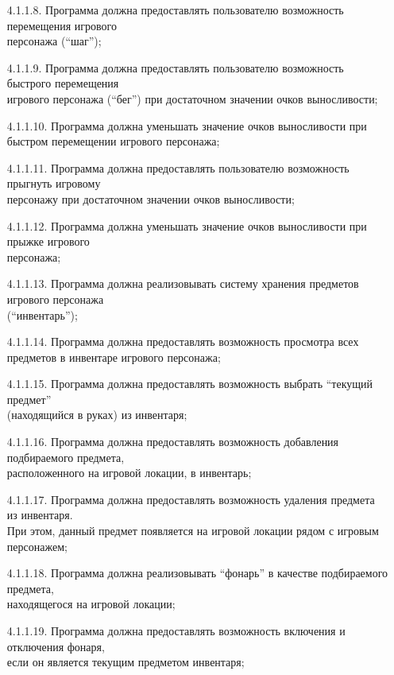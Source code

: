 \begin{enumerate}
    \item[4.1.1.8.] Программа должна предоставлять пользователю возможность перемещения игрового\\
    персонажа (``шаг'');
    \item[4.1.1.9.] Программа должна предоставлять пользователю возможность быстрого перемещения\\
    игрового персонажа (``бег'') при достаточном значении очков выносливости;
    \item[4.1.1.10.] Программа должна уменьшать значение очков выносливости при быстром перемещении игрового персонажа;
    \item[4.1.1.11.] Программа должна предоставлять пользователю возможность прыгнуть игровому\\
    персонажу при достаточном значении очков выносливости;
    \item[4.1.1.12.] Программа должна уменьшать значение очков выносливости при прыжке игрового\\
    персонажа;
    \item[4.1.1.13.] Программа должна реализовывать систему хранения предметов игрового персонажа\\
    (``инвентарь'');
    \item[4.1.1.14.] Программа должна предоставлять возможность просмотра всех предметов в инвентаре игрового персонажа;
    \item[4.1.1.15.] Программа должна предоставлять возможность выбрать ``текущий предмет''\\
    (находящийся в руках) из инвентаря;
    \item[4.1.1.16.] Программа должна предоставлять возможность добавления подбираемого предмета,\\
    расположенного на игровой локации, в инвентарь;
    \item[4.1.1.17.] Программа должна предоставлять возможность удаления предмета из инвентаря.\\
    При этом, данный предмет появляется на игровой локации рядом с игровым персонажем;
    \item[4.1.1.18.] Программа должна реализовывать ``фонарь'' в качестве подбираемого предмета,\\
    находящегося на игровой локации;
    \item[4.1.1.19.] Программа должна предоставлять возможность включения и отключения фонаря,\\
    если он является текущим предметом инвентаря;

\end{enumerate}
